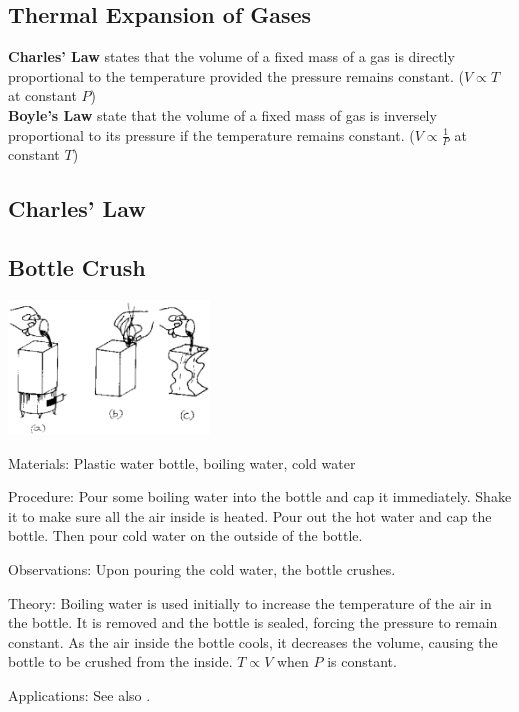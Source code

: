 \begin{multicols}{2}

\section*{Thermal Expansion of Gases}
\textbf{Charles' Law} states that the volume of a fixed mass of a gas is directly proportional to the temperature provided the pressure remains constant. ($V \propto T$ at constant $P$)\\
\textbf{Boyle's Law} state that the volume of a fixed mass of gas is inversely proportional to its pressure if the temperature remains constant. ($V \propto \frac{1}{P}$ at constant $T$)

\subsection*{Charles' Law}

\subsection{Bottle Crush}

\begin{center}
\includegraphics[width=0.4\textwidth]{./img/source/bottle-crush.png}
\end{center}

\begin{description*}
\item[Materials:]{Plastic water bottle, boiling water, cold water}
\item[Procedure:]{Pour some boiling water into the bottle and cap it immediately. Shake it to make sure all the air inside is heated. Pour out the hot water and cap the bottle. Then pour cold water on the outside of the bottle.}
\item[Observations:]{Upon pouring the cold water, the bottle crushes.}
\item[Theory:]{Boiling water is used initially to increase the temperature of the air in the bottle. It is removed and the bottle is sealed, forcing the pressure to remain constant. As the air inside the bottle cools, it decreases the volume, causing the bottle to be crushed from the inside. $T \propto V$ when $P$ is constant.}
\item[Applications:]{See also .}
\end{description*}


\end{multicols}
